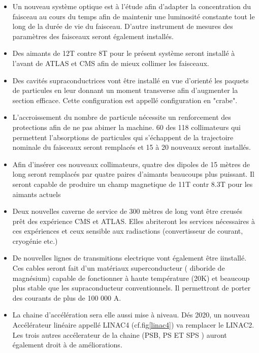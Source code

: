 \begin{itemize}[label=$\bullet$]
	
 \item Un nouveau système optique est à l'étude afin d'adapter la concentration du faisceau au cours du temps afin de maintenir une luminosité constante tout le long de la durée de vie du faisceau. D'autre instrument de mesures des paramètres des faisceaux seront également installés.
 
 \item Des aimants de 12T contre 8T pour le présent système seront installé à l'avant de ATLAS et CMS afin de mieux collimer les faisceaux.
 
 \item Des cavités supraconductrices vont être installé en vue d'orienté les paquets de particules en leur donnant un moment transverse afin d'augmenter la section efficace. Cette configuration est appellé configuration en "crabe".
 
 \item L'accroissement du nombre de particule nécessite un renforcement des protections afin de ne pas abimer la machine. 60 des 118 collimateurs qui permettent l'absorptions de particules qui s'échappent de la trajectoire nominale du faisceaux seront remplacés et 15 à 20 nouveaux seront installés.
 
 \item Afin d'insérer ces nouveaux collimateurs, quatre des dipoles de 15 mètres de long seront remplacés par quatre paires d'aimants beaucoups plus puissant. Il seront capable de produire un champ magnetique de 11T contr 8.3T pour les aimants actuels
 
 \item Deux nouvelles caverne de service de 300 mètres de long vont être creusés prêt des expérience CMS et ATLAS. Elles abriteront les services nécessaires à ces expériences et ceux sensible aux radiactions (convertisseur de courant, cryogénie etc.)
 
 \item De nouvelles lignes de transmitions electrique vont également être iinstallé. Ces cables seront fait d'un matériaux superconducteur ( diboride de magnésium) capable de fonctionner à haute température (20K) et beaucoup plus stable que les supraconducteur conventionnels. Il permettront de porter des courants de plus de 100 000 A.
 \item La chaine d'accélération sera elle aussi mise à niveau. Dés 2020, un nouveau Accélérateur linéaire appellé LINAC4 (cf.fig\ref{linac4}) va remplacer le LINAC2. Les trois autres accélerateur de la chaine (PSB, PS ET SPS ) auront également droit à de améliorations.
\end{itemize}


